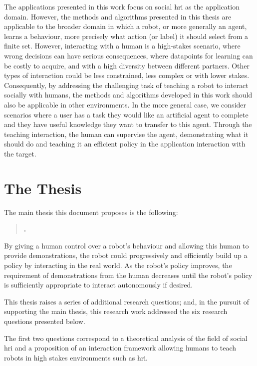 The applications presented in this work focus on social \gls{hri} as the application domain. However, the methods and algorithms presented in this thesis are applicable to the broader domain in which a robot, or more generally an agent, learns a behaviour, more precisely what action (or label) it should select from a finite set. However, interacting with a human is a high-stakes scenario, where wrong decisions can have serious consequences, where datapoints for learning can be costly to acquire, and with a high diversity between different partners. Other types of interaction could be less constrained, less complex or with lower stakes. Consequently, by addressing the challenging task of teaching a robot to interact socially with humans, the methods and algorithms developed in this work should also be applicable in other environments. In the more general case, we consider scenarios where a user has a task they would like an artificial agent to complete and they have useful knowledge they want to transfer to this agent. Through the teaching interaction, the human can supervise the agent, demonstrating what it should do and teaching it an efficient policy in the application interaction with the target. 

\section{The Thesis}\label{sec:intro_thesis}

The main thesis this document proposes is the following:
\begin{quote}
	\textbf{\thesis.}
\end{quote}

By giving a human control over a robot's behaviour and allowing this human to provide demonstrations, the robot could progressively and efficiently build up a policy by interacting in the real world. As the robot's policy improves, the requirement of demonstrations from the human decreases until the robot's policy is sufficiently appropriate to interact autonomously if desired.

This thesis raises a series of additional research questions; and, in the pursuit of supporting the main thesis, this research work addressed the six research questions presented below.

The first two questions correspond to a theoretical analysis of the field of social \gls{hri} and a proposition of an interaction framework allowing humans to teach robots in high stakes environments such as \gls{hri}.

